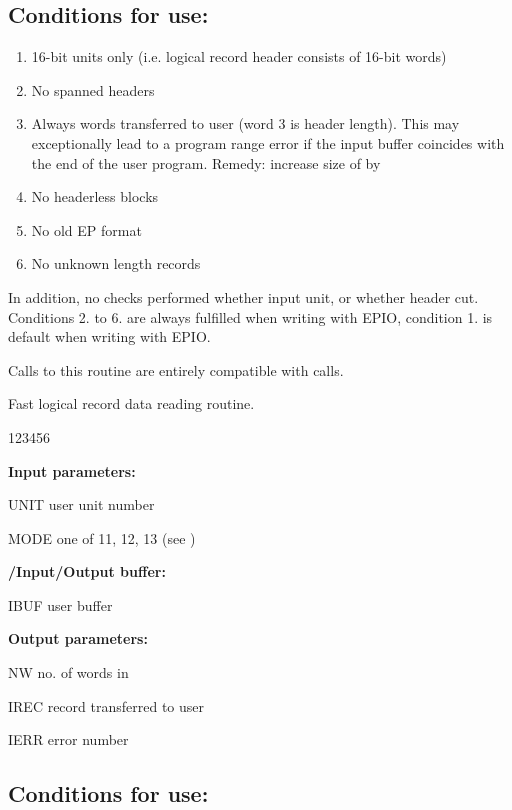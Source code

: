 \subsection*{Conditions for use:}
\begin{enumerate}
\item 16-bit units only (i.e. logical record header consists of 16-bit
      words)
\item No spanned headers
\item Always  words transferred to user (word 3 is header length).
      This may exceptionally lead to a program range error if the input
      buffer  coincides with the end of the user program.
      Remedy: increase size of  by 
\item No headerless blocks
\item No old EP format
\item No unknown length records
\end{enumerate}

In addition, no checks performed whether input unit, or whether header
cut.
Conditions 2. to 6. are always fulfilled when writing with EPIO,
condition 1. is default when writing with EPIO.

Calls to this routine are entirely compatible with  calls.


Fast logical record data reading routine.
 
\begin{DLtt}{123456}
\item[{\rm\bf Input parameters:}]
\item[UNIT] user unit number
\item[MODE] one of 11, 12, 13 (see )
\item[{\rm\bf /Input/Output buffer:}]
\item[IBUF] user buffer
\item[{\rm\bf Output parameters:}]
\item[NW] no. of words in 
\item[IREC] record transferred to user
\item[IERR] error number
\end{DLtt}

\subsection*{Conditions for use:}

